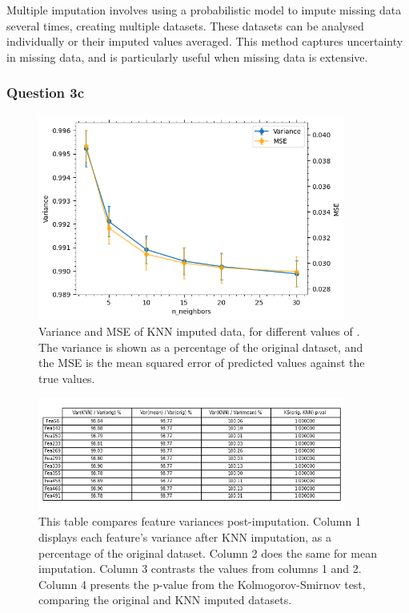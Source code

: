     Multiple imputation involves using a probabilistic model to impute missing data several times, creating multiple datasets.
    These datasets can be analysed individually or their imputed values averaged.
    This method captures uncertainty in missing data, and is particularly useful when missing data is extensive.

\subsubsection{Question 3c}\label{subsubsec:q3c}
    \begin{figure}[htb]
    \centering
    \includegraphics[width=0.9\textwidth]{./figures/q3c_optimise_knn_imputer}
    \caption{Variance and MSE of KNN imputed data, for different values of . The variance is shown as a
        percentage of the original dataset, and the MSE is the mean squared error of predicted values against the true
        values.}
    \label{fig:q3c_optimise_knn_imputer}
    \end{figure}

    \begin{figure}[htb]
    \centering
    \includegraphics[width=0.9\textwidth]{./figures/q3c_2}
    \caption{This table compares feature variances post-imputation.
        Column 1 displays each feature's variance after KNN imputation, as a percentage of the original dataset.
        Column 2 does the same for mean imputation.
        Column 3 contrasts the values from columns 1 and 2.
        Column 4 presents the p-value from the Kolmogorov-Smirnov test, comparing the original and KNN imputed datasets.}
    \label{fig:q3c_2}
    \end{figure}

